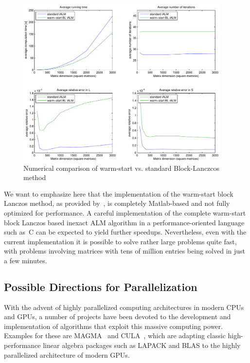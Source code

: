 \begin{figure}[h]
\centering
\includegraphics[width=0.95\textwidth]{../figures/BLWS_comparison}
\caption{Numerical comparison of warm-start vs. standard Block-Lanczcos method}
\label{Algorithms:Discussion:SVD:BLWScomptarison:figure}
\end{figure}

We want to emphasize here that the implementation of the warm-start block Lanczos method, as provided by~\cite{Lin:2011kx}, is completely Matlab-based and not fully optimized for performance. A careful implementation of the complete warm-start block Lanczos based inexact ALM algorithm in a performance-oriented language such as~C can be expected to yield further speedups. Nevertheless, even with the current implementation it is possible to solve rather large problems quite fast, with problems involving matrices with tens of million entries being solved in just a few minutes. 









\subsection{Possible Directions for Parallelization}
\label{Algorithms:Discussion:Parallel:Subsec}

With the advent of highly parallelized computing architectures in modern CPUs and GPUs, a number of projects have been devoted to the development and implementation of algorithms that exploit this massive computing power. Examples for these are MAGMA~\cite{Smith:2010tg} and CULA~\cite{Humphrey:2010kl}, which are adapting classic high-performance linear algebra packages such as LAPACK and BLAS to the highly parallelized architecture of modern GPUs. 

